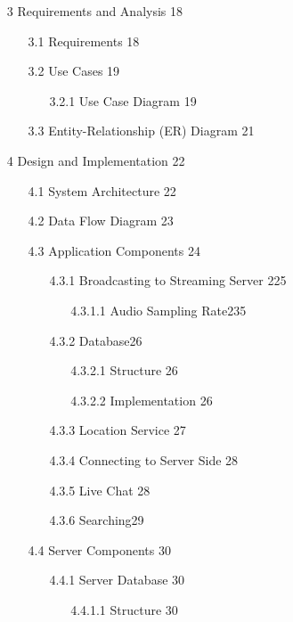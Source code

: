 \documentclass{article}
\begin{document}
\begin{itemize}
\begin{itemize}
\begin{itemize}
		\end{itemize}
	\end{itemize}
    	\item [3] Requirements and Analysis \hfill18
	\begin{itemize}
		\item [3.1] Requirements \hfill18
		\item [3.2] Use Cases \hfill19
		\begin{itemize}
			\item [3.2.1] Use Case Diagram \hfill19
		\end{itemize}
		\item [3.3] Entity-Relationship (ER) Diagram \hfill21
	\end{itemize}
	\item [4] Design and Implementation \hfill22
	\begin{itemize}
		\item [4.1] System Architecture \hfill22
		\item [4.2] Data Flow Diagram \hfill23
		\item [4.3] Application Components \hfill24
		\begin{itemize}
			\item [4.3.1] Broadcasting to Streaming Server \hfill225
			\begin{itemize}
				\item [4.3.1.1] Audio Sampling Rate\hfill235
			\end{itemize}
			\item [4.3.2] Database\hfill26
			\begin{itemize}
				\item [4.3.2.1] Structure \hfill26
				\item [4.3.2.2] Implementation \hfill26
			\end{itemize}
			\item [4.3.3] Location Service \hfill27
			\item [4.3.4] Connecting to Server Side \hfill28
			\item [4.3.5] Live Chat \hfill28
			\item [4.3.6] Searching\hfill29
		\end{itemize}
		\item [4.4] Server Components \hfill30
		\begin{itemize}
			\item [4.4.1] Server Database \hfill30
			\begin{itemize}
				\item [4.4.1.1] Structure \hfill30

\end{itemize}
\end{itemize}
\end{itemize}
\end{itemize}
\end{document}
